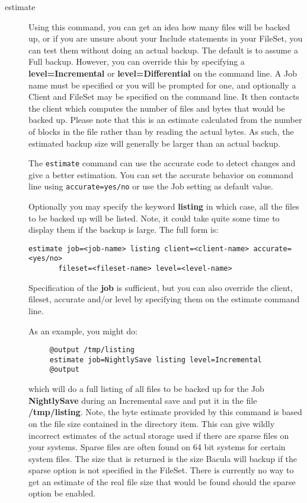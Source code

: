 \begin{description}
\label{estimate}
\item [estimate]
   Using this command, you can get an idea how many files will be backed
   up, or if you are unsure about your Include statements in your FileSet,
   you can test them without doing an actual backup.  The default is to
   assume a Full backup.  However, you can override this by specifying a
   {\bf level=Incremental} or {\bf level=Differential} on the command line.
   A Job name must be specified or you will be prompted for one, and
   optionally a Client and FileSet may be specified on the command line.
   It then contacts the client which computes the number of files and bytes
   that would be backed up.  Please note that this is an estimate
   calculated from the number of blocks in the file rather than by reading
   the actual bytes.  As such, the estimated backup size will generally be
   larger than an actual backup.

   The \texttt{estimate} command can use the accurate code to detect changes
   and give a better estimation. You can set the accurate behavior on command
   line using \texttt{accurate=yes/no} or use the Job setting as default value.

   Optionally you may specify the keyword {\bf listing} in  which case, all the
   files to be backed up will be listed.  Note, it could take quite some time to
   display them if the  backup is large. The full form is:

\begin{verbatim}
estimate job=<job-name> listing client=<client-name> accurate=<yes/no>
       fileset=<fileset-name> level=<level-name>
\end{verbatim}

   Specification of the {\bf job} is sufficient, but you can also override the
   client, fileset, accurate and/or level by specifying them on the estimate
   command line.


As an example, you might do:

\footnotesize
\begin{verbatim}
     @output /tmp/listing
     estimate job=NightlySave listing level=Incremental
     @output
\end{verbatim}
\normalsize

   which will do a full listing of all files to be backed up for the  Job {\bf
   NightlySave} during an Incremental save and put it in the  file {\bf
   /tmp/listing}.  Note, the byte estimate provided by this command is
   based on the file size contained in the directory item. This can give
   wildly incorrect estimates of the actual storage used if there are
   sparse files on your systems. Sparse files are often found on 64 bit
   systems for certain system files. The size that is returned is the size
   Bacula will backup if the sparse option is not specified in the FileSet.
   There is currently no way to get an estimate of the real file size that
   would be found should the sparse option be enabled.


\end{description}
